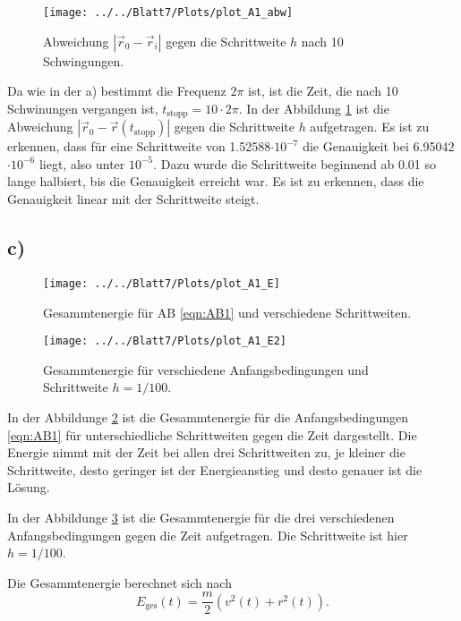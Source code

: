     \begin{figure}
      \centering
      \texttt{[image: ../../Blatt7/Plots/plot\_A1\_abw]}
      \caption{Abweichung $|\vec{r}_0 - \vec{r}_i|$ gegen die Schrittweite $h$ nach 10 Schwingungen.}
      \label{fig:A1abw}
    \end{figure}
    Da wie in der a) bestimmt die Frequenz $2\pi$ ist, ist die Zeit, die nach
    10 Schwinungen vergangen ist, $t_\text{stopp}=10\cdot2\pi$. In der Abbildung \ref{fig:A1abw}
    ist die Abweichung $|\vec{r}_0 - \vec{r}(t_\text{stopp})|$ gegen die Schrittweite $h$
    aufgetragen.
    Es ist zu erkennen, dass für eine Schrittweite von 1.52588$\cdot10^{-7}$ die Genauigkeit bei 6.95042$\cdot10^{-6}$ liegt, also unter $10^{-5}$. Dazu wurde die Schrittweite beginnend ab 0.01 so lange halbiert, bis die Genauigkeit erreicht war. Es ist zu erkennen, dass die Genauigkeit linear mit der Schrittweite steigt.

  \subsection*{c)}

    \begin{figure}
      \centering
      \texttt{[image: ../../Blatt7/Plots/plot\_A1\_E]}
      \caption{Gesammtenergie für AB \ref{eqn:AB1} und verschiedene Schrittweiten.}
      \label{fig:A1E}
    \end{figure}
    \begin{figure}
      \centering
      \texttt{[image: ../../Blatt7/Plots/plot\_A1\_E2]}
      \caption{Gesammtenergie für verschiedene Anfangsbedingungen und Schrittweite $h=1/100$.}
      \label{fig:A1E2}
    \end{figure}

    In der Abbildunge \ref{fig:A1E} ist die Gesammtenergie für die
    Anfangsbedingungen \ref{eqn:AB1} für unterschiedliche Schrittweiten
    gegen die Zeit dargestellt. Die Energie nimmt mit der Zeit bei allen drei
    Schrittweiten zu, je kleiner die Schrittweite, desto geringer ist der Energieanstieg
    und desto genauer ist die Lösung.

    In der Abbildunge \ref{fig:A1E2} ist die Gesammtenergie für die drei verschiedenen
    Anfangsbedingungen gegen die Zeit aufgetragen. Die Schrittweite ist hier $h=1/100$.

    Die Gesammtenergie berechnet sich nach
    \begin{equation}
      E_\text{ges}(t) = \frac{m}{2}(v^2(t)+r^2(t)).
    \end{equation}

